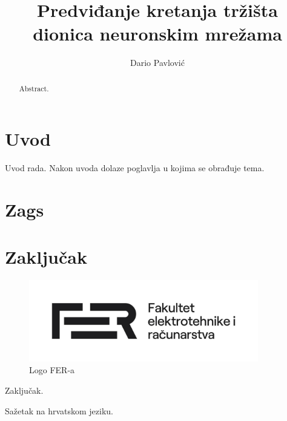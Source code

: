 \documentclass[times, utf8, zavrsni]{fer}
\begin{document}

\title{Predviđanje kretanja tržišta dionica neuronskim mrežama}

\author{Dario Pavlović}

\maketitle



\zahvala{}

\tableofcontents

\chapter{Uvod}
Uvod rada. Nakon uvoda dolaze poglavlja u kojima se obrađuje tema.

\chapter{Zags}

\chapter{Zaključak}

\begin{figure}[htb]
\centering
\includegraphics[width=10cm]{img/FER_logo.jpg}
\caption{Logo FER-a}
\label{fig:fer-logo}
\end{figure}

Zaključak.





\begin{sazetak}
Sažetak na hrvatskom jeziku.

\end{sazetak}

\begin{abstract}
Abstract.

\end{abstract}
\end{document}
